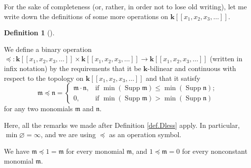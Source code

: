 \documentclass
[numbers=enddot,12pt,final,onecolumn,notitlepage,abstracton]{scrartcl}%
\theoremstyle{definition}
\newtheorem{defi}[theo]{Definition}
\newenvironment{definition}[1][]
{\begin{defi}[#1]\begin{leftbar}}
{\end{leftbar}\end{defi}}
\newenvironment{verlong}{}{}
\begin{document}
\begin{verlong}
For the sake of completeness (or, rather, in order not to lose old writing),
let me write down the definitions of some more operations on $\mathbf{k}%
\left[  \left[  x_{1},x_{2},x_{3},\ldots\right]  \right]  $.

\begin{definition}
We define a binary operation $\left.  \preceq\right.  :\mathbf{k}\left[
\left[  x_{1},x_{2},x_{3},\ldots\right]  \right]  \times\mathbf{k}\left[
\left[  x_{1},x_{2},x_{3},\ldots\right]  \right]  \rightarrow\mathbf{k}\left[
\left[  x_{1},x_{2},x_{3},\ldots\right]  \right]  $ (written in infix
notation) by the requirements that it be $\mathbf{k}$-bilinear and continuous
with respect to the topology on $\mathbf{k}\left[  \left[  x_{1},x_{2}%
,x_{3},\ldots\right]  \right]  $ and that it satisfy%
\[
\mathfrak{m}\left.  \preceq\right.  \mathfrak{n}=
\begin{cases}
\mathfrak{m}\cdot\mathfrak{n}, & \text{if }\min\left(  \operatorname*{Supp}%
\mathfrak{m}\right)  \leq\min\left(  \operatorname*{Supp}\mathfrak{n}\right)
;\\
0, & \text{if }\min\left(  \operatorname*{Supp}\mathfrak{m}\right)
>\min\left(  \operatorname*{Supp}\mathfrak{n}\right)
\end{cases}
\]
for any two monomials $\mathfrak{m}$ and $\mathfrak{n}$.
\end{definition}

Here, all the remarks we made after Definition \ref{def.Dless} apply. In
particular, $\min\varnothing=\infty$, and we are using $\left.  \preceq
\right.  $ as an operation symbol.

We have $\mathfrak{m}\left.  \preceq\right.  1=\mathfrak{m}$ for every
monomial $\mathfrak{m}$, and $1\left.  \preceq\right.  \mathfrak{m}=0$ for
every nonconstant monomial $\mathfrak{m}$.


\end{verlong}
\end{document}
